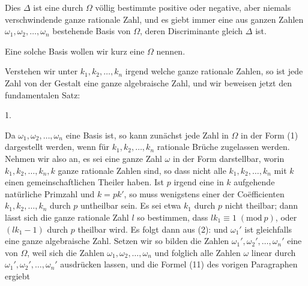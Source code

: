 Dies $\varDelta$ ist eine durch $\Omega$ völlig bestimmte positive oder negative, aber niemals verschwindende ganze rationale Zahl, und es giebt immer eine aus ganzen Zahlen $\omega_1, \omega_2, \ldots, \omega_n$ bestehende Basis von $\Omega$, deren Discriminante gleich $\varDelta$ ist.

Eine solche Basis wollen wir kurz eine  $\Omega$ nennen.

Verstehen wir unter $k_1, k_2, \ldots, k_n$ irgend welche ganze rationale Zahlen, so ist jede Zahl von der Gestalt
eine ganze algebraische Zahl, und wir beweisen jetzt den fundamentalen Satz:

1. 

Da $\omega_1, \omega_2, \ldots, \omega_n$ eine Basis ist, so kann zunächst jede Zahl in $\Omega$ in der Form (1) dargestellt werden, wenn für $k_1, k_2, \ldots, k_n$ rationale Brüche zugelassen werden. Nehmen wir also an, es sei eine ganze Zahl $\omega$ in der Form
darstellbar, worin $k_1, k_2, \ldots, k_n, k$ ganze rationale Zahlen sind, so dass nicht alle $k_1, k_2, \ldots, k_n$ mit $k$ einen gemeinschaftlichen Theiler haben. Ist $p$ irgend eine in $k$ aufgehende natürliche Primzahl und $k = pk'$, so muss wenigstens einer der Coëfficienten $k_1, k_2, \ldots, k_n$ durch $p$ untheilbar sein. Es sei etwa $k_1$ durch $p$ nicht theilbar; dann lässt sich die ganze rationale Zahl $l$ so bestimmen, dass $l k_1 \equiv 1 \; (\mathrm{mod}\ p)$, oder $(l k_1 - 1)$ durch $p$ theilbar wird. Es folgt dann aus (2):
und $\omega_1'$ ist gleichfalls eine ganze algebraische Zahl. Setzen wir
so bilden die Zahlen $\omega_1', \omega_2', \ldots, \omega_n'$ eine  von $\Omega$, weil sich die Zahlen $\omega_1, \omega_2, \ldots, \omega_n$ und folglich alle Zahlen $\omega$ linear durch $\omega_1', \omega_2', \ldots, \omega_n'$ ausdrücken lassen, und die Formel (11) des vorigen Paragraphen ergiebt
